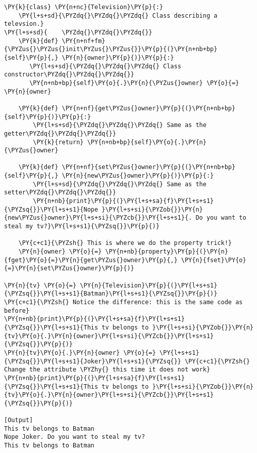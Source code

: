 \begin{Verbatim}[label=\makebox{\url{https://github.com/lucabaldini/cmepda/tree/master/slides/latex/snippets/class\_tv\_encapsulation\_properties\_verbose.py}},commandchars=\\\{\}]
\PY{k}{class} \PY{n+nc}{Television}\PY{p}{:}
    \PY{l+s+sd}{\PYZdq{}\PYZdq{}\PYZdq{} Class describing a televsion.}
\PY{l+s+sd}{    \PYZdq{}\PYZdq{}\PYZdq{}}
    \PY{k}{def} \PY{n+nf+fm}{\PYZus{}\PYZus{}init\PYZus{}\PYZus{}}\PY{p}{(}\PY{n+nb+bp}{self}\PY{p}{,} \PY{n}{owner}\PY{p}{)}\PY{p}{:}
       \PY{l+s+sd}{\PYZdq{}\PYZdq{}\PYZdq{} Class constructor\PYZdq{}\PYZdq{}\PYZdq{}}
       \PY{n+nb+bp}{self}\PY{o}{.}\PY{n}{\PYZus{}owner} \PY{o}{=} \PY{n}{owner}

    \PY{k}{def} \PY{n+nf}{get\PYZus{}owner}\PY{p}{(}\PY{n+nb+bp}{self}\PY{p}{)}\PY{p}{:}
        \PY{l+s+sd}{\PYZdq{}\PYZdq{}\PYZdq{} Same as the getter\PYZdq{}\PYZdq{}\PYZdq{}}
        \PY{k}{return} \PY{n+nb+bp}{self}\PY{o}{.}\PY{n}{\PYZus{}owner}

    \PY{k}{def} \PY{n+nf}{set\PYZus{}owner}\PY{p}{(}\PY{n+nb+bp}{self}\PY{p}{,} \PY{n}{new\PYZus{}owner}\PY{p}{)}\PY{p}{:}
        \PY{l+s+sd}{\PYZdq{}\PYZdq{}\PYZdq{} Same as the setter\PYZdq{}\PYZdq{}\PYZdq{}}
        \PY{n+nb}{print}\PY{p}{(}\PY{l+s+sa}{f}\PY{l+s+s1}{\PYZsq{}}\PY{l+s+s1}{Nope }\PY{l+s+si}{\PYZob{}}\PY{n}{new\PYZus{}owner}\PY{l+s+si}{\PYZcb{}}\PY{l+s+s1}{. Do you want to steal my tv?}\PY{l+s+s1}{\PYZsq{}}\PY{p}{)}

    \PY{c+c1}{\PYZsh{} This is where we do the property trick!}
    \PY{n}{owner} \PY{o}{=} \PY{n+nb}{property}\PY{p}{(}\PY{n}{fget}\PY{o}{=}\PY{n}{get\PYZus{}owner}\PY{p}{,} \PY{n}{fset}\PY{o}{=}\PY{n}{set\PYZus{}owner}\PY{p}{)}

\PY{n}{tv} \PY{o}{=} \PY{n}{Television}\PY{p}{(}\PY{l+s+s1}{\PYZsq{}}\PY{l+s+s1}{Batman}\PY{l+s+s1}{\PYZsq{}}\PY{p}{)}
\PY{c+c1}{\PYZsh{} Notice the difference: this is the same code as before}
\PY{n+nb}{print}\PY{p}{(}\PY{l+s+sa}{f}\PY{l+s+s1}{\PYZsq{}}\PY{l+s+s1}{This tv belongs to }\PY{l+s+si}{\PYZob{}}\PY{n}{tv}\PY{o}{.}\PY{n}{owner}\PY{l+s+si}{\PYZcb{}}\PY{l+s+s1}{\PYZsq{}}\PY{p}{)}
\PY{n}{tv}\PY{o}{.}\PY{n}{owner} \PY{o}{=} \PY{l+s+s1}{\PYZsq{}}\PY{l+s+s1}{Joker}\PY{l+s+s1}{\PYZsq{}} \PY{c+c1}{\PYZsh{} Change the attribute \PYZhy{} this time it does not work}
\PY{n+nb}{print}\PY{p}{(}\PY{l+s+sa}{f}\PY{l+s+s1}{\PYZsq{}}\PY{l+s+s1}{This tv belongs to }\PY{l+s+si}{\PYZob{}}\PY{n}{tv}\PY{o}{.}\PY{n}{owner}\PY{l+s+si}{\PYZcb{}}\PY{l+s+s1}{\PYZsq{}}\PY{p}{)}

[Output]
This tv belongs to Batman
Nope Joker. Do you want to steal my tv?
This tv belongs to Batman
\end{Verbatim}